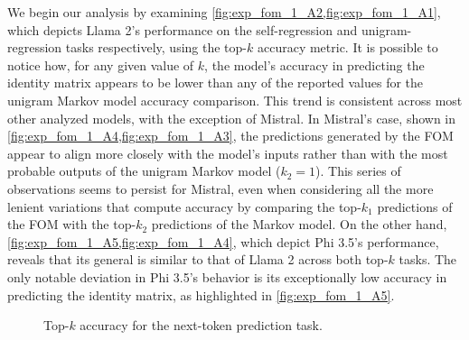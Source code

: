 We begin our analysis by examining \cref{fig:exp_fom_1_A2,fig:exp_fom_1_A1}, which depicts Llama 2's performance on the self-regression and unigram-regression tasks respectively, using the top-$k$ accuracy metric.
It is possible to notice how, for any given value of $k$, the model's accuracy in predicting the identity matrix appears to be lower than any of the reported values for the unigram Markov model accuracy comparison.
This trend is consistent across most other analyzed models, with the exception of Mistral.
In Mistral's case, shown in \cref{fig:exp_fom_1_A4,fig:exp_fom_1_A3}, the predictions generated by the FOM appear to align more closely with the model's inputs rather than with the most probable outputs of the unigram Markov model ($k_2 = 1$).
This series of observations seems to persist for Mistral, even when considering all the more lenient variations that compute accuracy by comparing the top-$k_1$ predictions of the FOM with the top-$k_2$ predictions of the Markov model.
On the other hand, \cref{fig:exp_fom_1_A5,fig:exp_fom_1_A4}, which depict Phi 3.5's performance, reveals that its general is similar to that of Llama 2 across both top-$k$ tasks.
The only notable deviation in Phi 3.5's behavior is its exceptionally low accuracy in predicting the identity matrix, as highlighted in \cref{fig:exp_fom_1_A5}.

\begin{figure}[t!]
    \centering
    \begingroup
    \captionsetup{width=0.9\textwidth/2}
    \quad
    \quad
    \endgroup
    \caption{Top-$k$ accuracy for the next-token prediction task.}
    \label{fig:exp_fom_1_A}
\end{figure}

